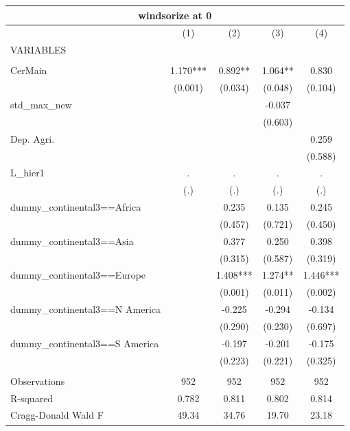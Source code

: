 \documentclass[12pt,a4paper]{article}
\begin{document}
\begin{tabular}{lcccc}
\multicolumn{5}{c}{windsorize at 0} \\ \hline
 & (1) & (2) & (3) & (4) \\
VARIABLES &  &  &  &  \\ \hline
 &  &  &  &  \\
CerMain & 1.170*** & 0.892** & 1.064** & 0.830 \\
 & (0.001) & (0.034) & (0.048) & (0.104) \\
std\_max\_new &  &  & -0.037 &  \\
 &  &  & (0.603) &  \\
Dep. Agri. &  &  &  & 0.259 \\
 &  &  &  & (0.588) \\
L\_hier1 & . & . & . & . \\
 & (.) & (.) & (.) & (.) \\
dummy\_continental3==Africa &  & 0.235 & 0.135 & 0.245 \\
 &  & (0.457) & (0.721) & (0.450) \\
dummy\_continental3==Asia &  & 0.377 & 0.250 & 0.398 \\
 &  & (0.315) & (0.587) & (0.319) \\
dummy\_continental3==Europe &  & 1.408*** & 1.274** & 1.446*** \\
 &  & (0.001) & (0.011) & (0.002) \\
dummy\_continental3==N America &  & -0.225 & -0.294 & -0.134 \\
 &  & (0.290) & (0.230) & (0.697) \\
dummy\_continental3==S America &  & -0.197 & -0.201 & -0.175 \\
 &  & (0.223) & (0.221) & (0.325) \\
 &  &  &  &  \\
Observations & 952 & 952 & 952 & 952 \\
R-squared & 0.782 & 0.811 & 0.802 & 0.814 \\
 Cragg-Donald Wald F & 49.34 & 34.76 & 19.70 & 23.18 \\ \hline
\end{tabular}
\end{document}
